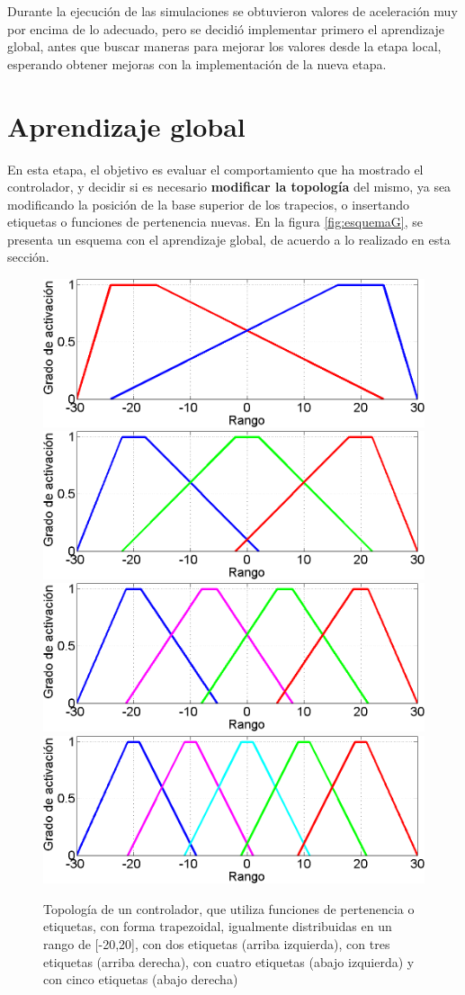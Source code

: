 Durante la ejecución de las simulaciones se obtuvieron valores de aceleración muy por encima de lo adecuado, pero se decidió implementar primero el aprendizaje global, antes que buscar maneras para mejorar los valores desde la etapa local, esperando obtener mejoras con la implementación de la nueva etapa.


\section{Aprendizaje global}
\label{sec:aprendizajeG}

En esta etapa, el objetivo es evaluar el comportamiento que ha mostrado el controlador, y decidir si es necesario \textbf{modificar la topología} del mismo, ya sea modificando la posición de la base superior de los trapecios, o insertando etiquetas o funciones de pertenencia nuevas. En la figura \ref{fig:esquemaG}, se presenta un esquema con el aprendizaje global, de acuerdo a lo realizado en esta sección.

\begin{figure}[!htb]
\centering
\includegraphics[width=0.35\linewidth]{figures/2.png} \hspace{0.5cm} \includegraphics[width=0.35\linewidth]{figures/3.png}
\includegraphics[width=0.35\linewidth]{figures/4.png} \hspace{0.5cm} \includegraphics[width=0.35\linewidth]{figures/5.png}
\caption{Topología de un controlador, que utiliza funciones de pertenencia o etiquetas, con forma trapezoidal, igualmente distribuidas en un rango de [-20,20], con dos etiquetas (arriba izquierda), con tres etiquetas (arriba derecha), con cuatro etiquetas (abajo izquierda) y con cinco etiquetas (abajo derecha)}
\label{fig:trapeciosD}
\end{figure} 

